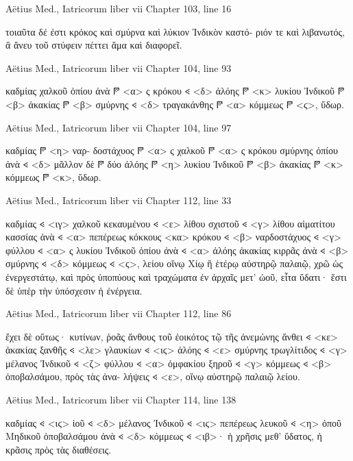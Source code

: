 \documentclass[12pt,letterpaper,twoside,final]{memoir}
\begin{document}
\begin{greek}
Aëtius Med., Iatricorum liber vii 
Chapter 103, line 16

                τοιαῦτα δέ ἐστι κρόκος καὶ σμύρνα καὶ λύκιον Ἰνδικὸν καστό-
ριόν τε καὶ λιβανωτός, ἃ ἄνευ τοῦ στύφειν πέττει ἅμα καὶ διαφορεῖ. 



Aëtius Med., Iatricorum liber vii 
Chapter 104, line 93

                                            καδμίας χαλκοῦ ὀπίου ἀνὰ 
𐆄 <α> ς κρόκου 𐅻 <δ> ἀλόης 𐆄 <κ> λυκίου Ἰνδικοῦ 𐆄 <β> ἀκακίας 𐆄 <β> σμύρνης 
𐅻 <δ> τραγακάνθης 𐆄 <α> κόμμεως 𐆄 <ϛ>, ὕδωρ. 



Aëtius Med., Iatricorum liber vii 
Chapter 104, line 97

                                                        καδμίας 𐆄 <η> ναρ-
δοστάχυος 𐆄 <α> ς χαλκοῦ 𐆄 <α> ς κρόκου σμύρνης ὀπίου ἀνὰ 𐅻 <δ> μᾶλλον 
δὲ 𐆄 δύο ἀλόης 𐆄 <η> λυκίου Ἰνδικοῦ 𐆄 <β> ἀκακίας 𐆄 <κ> κόμμεως 𐆄 <κ>, 
ὕδωρ. 



Aëtius Med., Iatricorum liber vii 
Chapter 112, line 33

                                                           καδμίας 𐅻 <ιγ> χαλκοῦ   
κεκαυμένου 𐅻 <ε> λίθου σχιστοῦ 𐅻 <γ> λίθου αἱματίτου κασσίας ἀνὰ 𐅻 <α> 
πεπέρεως κόκκους <κα> κρόκου 𐅻 <β> ναρδοστάχυος 𐅻 <γ> φύλλου 𐅻 <α> ς 
λυκίου Ἰνδικοῦ ὀπίου ἀνὰ 𐅻 <α> ἀλόης ἀκακίας κιρρᾶς ἀνὰ 𐅻 <β> σμύρνης 
𐅻 <δ> κόμμεως 𐅻 <ϛ>, λείου οἴνῳ Χίῳ ἢ ἑτέρῳ αὐστηρῷ παλαιῷ, χρῶ ὡς 
ἐνεργεστάτῳ, καὶ πρὸς ὑποπύους καὶ τραχώματα ἐν ἀρχαῖς μετ' ὠοῦ, 
εἶτα ὕδατι· ἔστι δὲ ὑπὲρ τὴν ὑπόσχεσιν ἡ ἐνέργεια. 



Aëtius Med., Iatricorum liber vii 
Chapter 112, line 86

                          ἔχει δὲ οὕτως· κυτίνων, ῥοᾶς ἄνθους τοῦ 
ἐοικότος τῷ τῆς ἀνεμώνης ἄνθει 𐅻 <κε> ἀκακίας ξανθῆς 𐅻 <λε> γλαυκίων 
𐅻 <ιϛ> ἀλόης 𐅻 <ε> σμύρνης τρωγλίτιδος 𐅻 <γ> μέλανος Ἰνδικοῦ 𐅻 <ζ> φύλλου 
𐅻 <α> ὀμφακίου ξηροῦ 𐅻 <γ> κόμμεως 𐅻 <β> ὀποβαλσάμου, πρὸς τὰς ἀνα-
λήψεις 𐅻 <ε>, οἴνῳ αὐστηρῷ παλαιῷ λείου. 



Aëtius Med., Iatricorum liber vii 
Chapter 114, line 138

                καδμίας 𐅻 <ιϛ> ἰοῦ 𐅻 <δ> μέλανος Ἰνδικοῦ 𐅻 <ιϛ> πεπέρεως 
λευκοῦ 𐅻 <η> ὀποῦ Μηδικοῦ ὀποβαλσάμου ἀνὰ 𐅻 <δ> κόμμεως 𐅻 <ιβ>· ἡ 
χρῆσις μεθ' ὕδατος, ἡ κρᾶσις πρὸς τὰς διαθέσεις. 




\end{greek}
\end{document}
